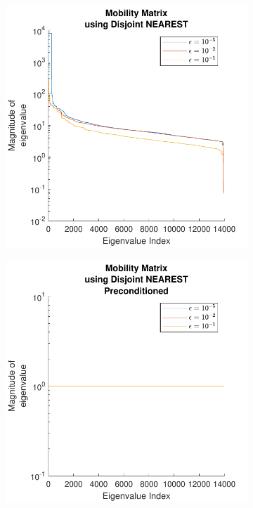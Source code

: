 \begin{figure}
\ContinuedFloat
    \begin{subfigure}{0.45\textwidth}
        \centering
        \includegraphics[width=\linewidth]{Images/Condition/Eigen-Mobility Matrix using Disjoint NEAREST.pdf}
    \end{subfigure}
    \hfill
    \begin{subfigure}{0.45\textwidth}
        \centering
        \includegraphics[width=\linewidth]{Images/Condition/Eigen-Mobility Matrix using Disjoint NEAREST Preconditioned.pdf}
    \end{subfigure}
\end{figure}



